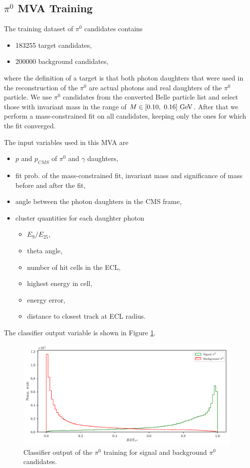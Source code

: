 \subsection{\texorpdfstring{$\pi^0$}{π0} MVA Training}

The training dataset of $\pi^0$ candidates contains
\begin{itemize}
	\item 183255 target candidates,
	\item 200000 background candidates,
\end{itemize}
where the definition of a target is that both photon daughters that were used in the reconstruction of the $\pi^0$ are actual photons and real daughters of the $\pi^0$ particle. We use $\pi^0$ candidates from the converted Belle particle list and select those with invariant mass in the range of $M \in [0.10,~0.16]\mathrm{~GeV}$. After that we perform a mass-constrained fit on all candidates, keeping only the ones for which the fit converged. 

The input variables used in this MVA are
\begin{itemize}
	\item $p$ and $p_{CMS}$ of $\pi^0$ and $\gamma$ daughters,
	\item fit prob. of the mass-constrained fit, invariant mass and significance of mass before and after the fit,
	\item angle between the photon daughters in the CMS frame,
	\item cluster quantities for each daughter photon
	\begin{itemize}
		\item $E_9/E_{25}$,
		\item theta angle,
		\item number of hit cells in the ECL,
		\item highest energy in cell,
		\item energy error,
		\item distance to closest track at ECL radius.
	\end{itemize}
\end{itemize}

The classifier output variable is shown in Figure \ref{fig:ROE_pi0}.

\begin{figure}[H]
	\centering
	\captionsetup{width=0.8\linewidth}
	\includegraphics[width=\linewidth]{fig/ROECleanup_pi0}
	\caption{Classifier output of the $\pi^0$ training for signal and background $\pi^0$ candidates.}
	\label{fig:ROE_pi0}
\end{figure}

